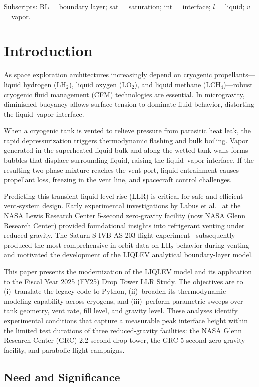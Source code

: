 \documentclass[conf]{new-aiaa}
\begin{document}
\noindent Subscripts: BL = boundary layer; sat = saturation; int = interface; $l$ = liquid; $v$ = vapor.

\section{Introduction}
As space exploration architectures increasingly depend on cryogenic propellants---liquid hydrogen (LH$_2$), liquid oxygen (LO$_2$), and liquid methane (LCH$_4$)---robust cryogenic fluid management (CFM) technologies are essential. In microgravity, diminished buoyancy allows surface tension to dominate fluid behavior, distorting the liquid--vapor interface.

When a cryogenic tank is vented to relieve pressure from parasitic heat leak, the rapid depressurization triggers thermodynamic flashing and bulk boiling. Vapor generated in the superheated liquid bulk and along the wetted tank walls forms bubbles that displace surrounding liquid, raising the liquid--vapor interface. If the resulting two-phase mixture reaches the vent port, liquid entrainment causes propellant loss, freezing in the vent line, and spacecraft control challenges.

Predicting this transient liquid level rise (LLR) is critical for safe and efficient vent-system design. Early experimental investigations by Labus et al.~\cite{Labus1972, Labus1974} at the NASA Lewis Research Center 5-second zero-gravity facility (now NASA Glenn Research Center) provided foundational insights into refrigerant venting under reduced gravity. The Saturn S-IVB AS-203 flight experiment~\cite{AS203_1970} subsequently produced the most comprehensive in-orbit data on LH$_2$ behavior during venting and motivated the development of the LIQLEV analytical boundary-layer model.

This paper presents the modernization of the LIQLEV model and its application to the Fiscal Year 2025 (FY25) Drop Tower LLR Study. The objectives are to (i)~translate the legacy code to Python, (ii)~broaden its thermodynamic modeling capability across cryogens, and (iii)~perform parametric sweeps over tank geometry, vent rate, fill level, and gravity level. These analyses identify experimental conditions that capture a measurable peak interface height within the limited test durations of three reduced-gravity facilities: the NASA Glenn Research Center (GRC) 2.2-second drop tower, the GRC 5-second zero-gravity facility, and parabolic flight campaigns.

\subsection{Need and Significance}
\label{sec:need_significance}
\end{document}

